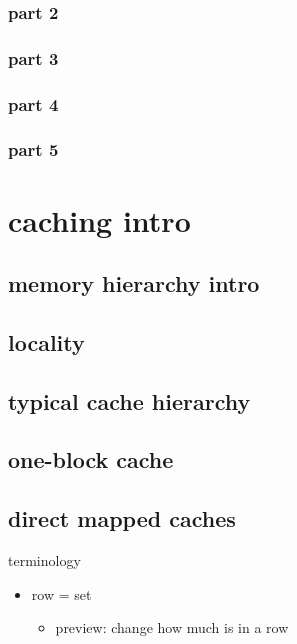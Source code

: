 \subsubsection{part 2}

\subsubsection{part 3}


\subsubsection{part 4}

\subsubsection{part 5}




\section{caching intro}

\subsection{memory hierarchy intro}


\subsection{locality}


\subsection{typical cache hierarchy}


\subsection{one-block cache}


\subsection{direct mapped caches}


\begin{frame}{terminology}
    \begin{itemize}
    \item row = set
        \begin{itemize}
        \item preview: change how much is in a row
        \end{itemize}
    \end{itemize}
\end{frame}

